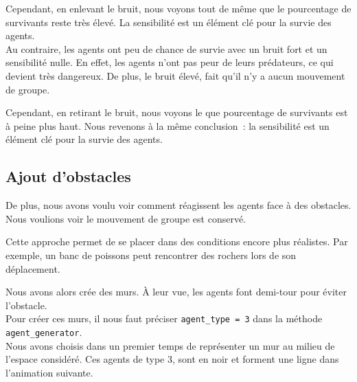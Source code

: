 \documentclass[french, a4paper, 12pt, openany]{report}
\begin{document}
   Cependant, en enlevant le bruit, nous voyons tout de même que le pourcentage de survivants reste très élevé. La sensibilité est un élément clé pour la survie des agents.\\

  Au contraire, les agents ont peu de chance de survie avec un bruit fort et un sensibilité nulle. En effet, les agents n'ont pas peur de leurs prédateurs, ce qui devient très dangereux. De plus, le bruit élevé, fait qu'il n'y a aucun mouvement de groupe.
  
  Cependant, en retirant le bruit, nous voyons le que pourcentage de survivants est à peine plus haut. Nous revenons à la même conclusion~: la sensibilité est un élément clé pour la survie des agents.
  

\subsection{Ajout d'obstacles}

   De plus, nous avons voulu voir comment réagissent les agents face à des obstacles. Nous voulions voir le mouvement de groupe est conservé. 
   
   Cette approche permet de se placer dans des conditions encore plus réalistes. Par exemple, un banc de poissons peut rencontrer des rochers lors de son déplacement. 
   
   Nous avons alors crée des murs. À leur vue, les agents font demi-tour pour éviter l'obstacle. \\
   
   Pour créer ces murs, il nous faut préciser \verb|agent_type = 3| dans la méthode \verb|agent_generator|.\\
   
   Nous avons choisis dans un premier temps de représenter un mur au milieu de l'espace considéré. Ces agents de type 3, sont en noir et forment une ligne dans l'animation suivante.\\
   
\end{document}
